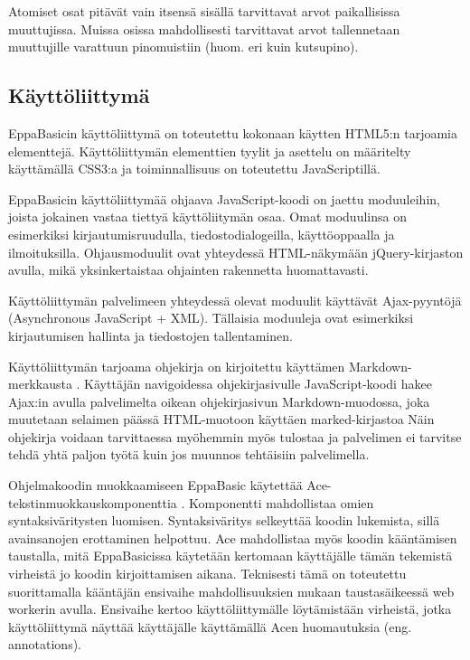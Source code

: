 Atomiset osat pitävät vain
itsensä sisällä tarvittavat
arvot paikallisissa muuttujissa.
Muissa osissa mahdollisesti tarvittavat
arvot tallennetaan muuttujille
varattuun pinomuistiin
(huom. eri kuin kutsupino).


\subsection{Käyttöliittymä}
EppaBasicin käyttöliittymä on toteutettu
kokonaan käytten HTML5:n tarjoamia elementtejä.
Käyttöliittymän elementtien tyylit ja asettelu
on määritelty käyttämällä CSS3:a ja
toiminnallisuus on toteutettu
JavaScriptillä.

EppaBasicin käyttöliittymää ohjaava JavaScript-koodi
on jaettu moduuleihin, joista jokainen vastaa
tiettyä käyttöliitymän osaa.
Omat moduulinsa on esimerkiksi kirjautumisruudulla,
tiedostodialogeilla, käyttöoppaalla ja ilmoituksilla.
Ohjausmoduulit ovat yhteydessä HTML-näkymään
jQuery-kirjaston \cite{jquery} avulla,
mikä yksinkertaistaa ohjainten rakennetta huomattavasti.

Käyttöliittymän palvelimeen yhteydessä olevat
moduulit käyttävät Ajax-pyyntöjä
(Asyn\-chro\-nous JavaScript + XML).
Tällaisia moduuleja ovat esimerkiksi
kirjautumisen hallinta ja tiedostojen tallentaminen.

Käyttöliittymän tarjoama ohjekirja on kirjoitettu
käyttämen Markdown-merkkausta \cite{markdown}.
Käyttäjän navigoidessa ohjekirjasivulle
JavaScript-koodi hakee Ajax:in avulla palvelimelta
oikean ohjekirjasivun Markdown-muodossa,
joka muutetaan selaimen päässä HTML-muotoon käyttäen
marked-kirjastoa \cite{marked}
Näin ohjekirja voidaan tarvittaessa myöhemmin
myös tulostaa ja palvelimen ei tarvitse tehdä
yhtä paljon työtä kuin jos
muunnos tehtäisiin palvelimella.

Ohjelmakoodin muokkaamiseen EppaBasic käytettää
Ace\hyp tekstinmuokkauskomponenttia \cite{ace_about}.
Komponentti mahdollistaa omien syntaksiväritysten luomisen.
Syntaksiväritys selkeyttää koodin lukemista,
sillä avainsanojen erottaminen helpottuu.
Ace mahdollistaa myös koodin kääntämisen taustalla,
mitä EppaBasicissa käytetään kertomaan käyttäjälle
tämän tekemistä virheistä jo koodin kirjoittamisen aikana.
Teknisesti tämä on toteutettu suorittamalla
kääntäjän ensivaihe mahdollisuuksien mukaan
taustasäikeessä web workerin \cite{w3c_web_worker} avulla.
Ensivaihe kertoo käyttöliittymälle löytämistään virheistä,
jotka käyttöliittymä näyttää käyttäjälle käyttämällä
Acen huomautuksia (eng. annotations).

